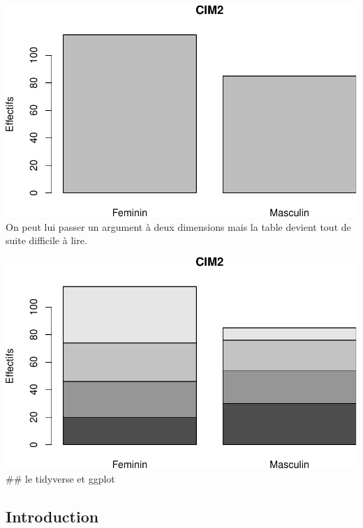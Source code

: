 \documentclass[
]{book}
\newenvironment{Shaded}{\begin{snugshade}}{\end{snugshade}}
\newcommand{\AttributeTok}[1]{\textcolor[rgb]{0.13,0.29,0.53}{#1}}
\newcommand{\FunctionTok}[1]{\textcolor[rgb]{0.13,0.29,0.53}{\textbf{#1}}}
\newcommand{\NormalTok}[1]{#1}
\newcommand{\OtherTok}[1]{\textcolor[rgb]{0.56,0.35,0.01}{#1}}
\newcommand{\SpecialCharTok}[1]{\textcolor[rgb]{0.81,0.36,0.00}{\textbf{#1}}}
\newcommand{\StringTok}[1]{\textcolor[rgb]{0.31,0.60,0.02}{#1}}
\begin{document}
\includegraphics{_main_files/figure-latex/sexe1-1.pdf}
On peut lui passer un argument à deux dimensions mais la table devient tout de
suite difficile à lire.

\begin{Shaded}
\end{Shaded}

\includegraphics{_main_files/figure-latex/sexe2-1.pdf}
\#\# le tidyverse et ggplot

\subsection{Introduction}\label{introduction-1}
\end{document}

